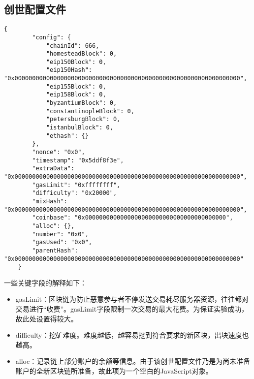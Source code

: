 %
%
%
%
%
%

\begin{appendices}

    \section{创世配置文件}

    \begin{lstlisting}[caption={创世配置文件}, label={lst:创世配置文件}]
    {
        "config": {
            "chainId": 666,
            "homesteadBlock": 0,
            "eip150Block": 0,
            "eip150Hash": "0x0000000000000000000000000000000000000000000000000000000000000000",
            "eip155Block": 0,
            "eip158Block": 0,
            "byzantiumBlock": 0,
            "constantinopleBlock": 0,
            "petersburgBlock": 0,
            "istanbulBlock": 0,
            "ethash": {}
        },
        "nonce": "0x0",
        "timestamp": "0x5ddf8f3e",
        "extraData": "0x0000000000000000000000000000000000000000000000000000000000000000",
        "gasLimit": "0xffffffff",
        "difficulty": "0x20000",
        "mixHash": "0x0000000000000000000000000000000000000000000000000000000000000000",
        "coinbase": "0x0000000000000000000000000000000000000000",
        "alloc": {},
        "number": "0x0",
        "gasUsed": "0x0",
        "parentHash": "0x0000000000000000000000000000000000000000000000000000000000000000"
    }
    \end{lstlisting}

    一些关键字段的解释如下：

    \begin{itemize}
        \item gasLimit：区块链为防止恶意参与者不停发送交易耗尽服务器资源，往往都对交易进行“收费”。gasLimit字段限制一次交易的最大花费。为保证实验成功，故此处设置得较大。
        \item difficulty：挖矿难度。难度越低，越容易挖到符合要求的新区块，出块速度也越高。
        \item alloc：记录链上部分账户的余额等信息。由于该创世配置文件乃是为尚未准备账户的全新区块链所准备，故此项为一个空白的JavaScript对象。
    \end{itemize}


\end{appendices}
